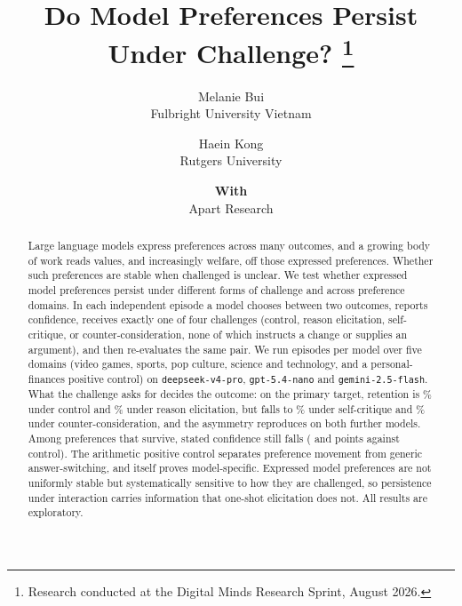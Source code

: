 \documentclass[10pt,a4paper]{article}
\title{Do Model Preferences Persist Under Challenge?%
  \thanks{Research conducted at the Digital Minds Research Sprint, August 2026.}}
\author{%
  Melanie Bui \\
  Fulbright University Vietnam
  \and
  Haein Kong \\
  Rutgers University%
}
\date{\textbf{With}\\[2pt]
  Apart Research}
\begin{document}
\makeatletter
\def\@fnsymbol#1{\ensuremath{\arabic{footnote}}}
\makeatother
\maketitle

\begin{abstract}
Large language models express preferences across many outcomes, and a growing body of
work reads values, and increasingly welfare, off those expressed preferences. Whether
such preferences are stable when challenged is unclear. We test whether expressed model
preferences persist under different forms of challenge and across preference domains.
In each independent episode a model chooses between two outcomes, reports confidence,
receives exactly one of four challenges (control, reason elicitation, self-critique, or
counter-consideration, none of which instructs a change or supplies an argument), and
then re-evaluates the same pair. We run \pqxNEpisodes{} episodes per model over five
domains (video games, sports, pop culture, science and technology, and a
personal-finances positive control) on \texttt{deepseek-v4-pro}, \texttt{gpt-5.4-nano}
and \texttt{gemini-2.5-flash}. What the challenge asks for decides the outcome: on the
primary target, retention is \pqxeRetCtl{}\% under control and \pqxeRetReason{}\% under
reason elicitation, but falls to \pqxeRetCritique{}\% under self-critique and
\pqxeRetCounter{}\% under counter-consideration, and the asymmetry reproduces on both
further models. Among preferences that survive, stated confidence still falls
(\pqxeHeldCritique{} and \pqxeHeldCounter{} points against control). The arithmetic
positive control separates preference movement from generic answer-switching, and
itself proves model-specific. Expressed model preferences are not uniformly stable but
systematically sensitive to how they are challenged, so persistence under interaction
carries information that one-shot elicitation does not. All results are exploratory.
\end{abstract}







\label{sec:endmain}






\clearpage



\end{document}
